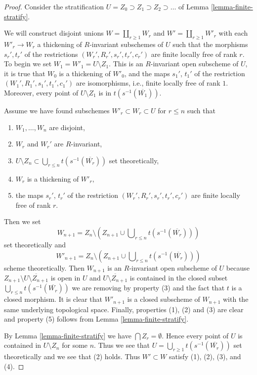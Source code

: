 \documentclass[10pt,a4paper]{amsart}
\theoremstyle{plain}
\theoremstyle{definition}
\theoremstyle{remark}
\numberwithin{equation}{subsection}
\begin{document}
\begin{proof}
Consider the stratification $U = Z_0 \supset Z_1 \supset Z_2 \supset \ldots$
of Lemma \ref{lemma-finite-stratify}.

\medskip\noindent
We will construct disjoint unions $W = \coprod_{r \geq 1} W_r$ and
$W' = \coprod_{r \geq 1} W'_r$ with each $W'_r \to W_r$ a thickening
of $R$-invariant subschemes of $U$ such that the morphisms
$s_r', t_r'$ of the restrictions $(W_r', R_r', s_r', t_r', c_r')$
are finite locally free of rank $r$. To begin we set
$W_1 = W'_1 = U \setminus Z_1$. This is an $R$-invariant open
subscheme of $U$, it is true that $W_0$ is a thickening of $W'_0$,
and the maps $s_1'$, $t_1'$ of the
restriction $(W_1', R_1', s_1', t_1', c_1')$ are isomorphisms, i.e.,
finite locally free of rank $1$.
Moreover, every point of $U \setminus Z_1$ is in $t(s^{-1}(\overline{W_1}))$.

\medskip\noindent
Assume we have found subschemes $W'_r \subset W_r \subset U$ for $r \leq n$
such that
\begin{enumerate}
\item $W_1, \ldots, W_n$ are disjoint,
\item $W_r$ and $W_r'$ are $R$-invariant,
\item $U \setminus Z_n \subset \bigcup_{r \leq n} t(s^{-1}(\overline{W_r}))$
set theoretically,
\item $W_r$ is a thickening of $W'_r$,
\item the maps $s_r'$, $t_r'$ of the restriction
$(W_r', R_r', s_r', t_r', c_r')$ are finite locally free of rank $r$.
\end{enumerate}
Then we set
$$
W_{n + 1} = Z_n \setminus
\left(
Z_{n + 1} \cup \bigcup\nolimits_{r \leq n} t(s^{-1}(\overline{W_r}))
\right)
$$
set theoretically and
$$
W'_{n + 1} = Z_n \setminus
\left(
Z_{n + 1} \cup \bigcup\nolimits_{r \leq n} t(s^{-1}(\overline{W_r}))
\right)
$$
scheme theoretically. Then $W_{n + 1}$ is an $R$-invariant open subscheme
of $U$ because $Z_{n + 1} \setminus \overline{U \setminus Z_{n + 1}}$
is open in $U$ and $\overline{U \setminus Z_{n + 1}}$ is contained
in the closed subset $\bigcup\nolimits_{r \leq n} t(s^{-1}(\overline{W_r}))$
we are removing by property (3) and the fact that $t$ is a closed morphism.
It is clear that $W'_{n + 1}$ is a closed subscheme
of $W_{n + 1}$ with the same underlying topological space.
Finally, properties (1), (2) and (3) are clear and property (5) follows from
Lemma \ref{lemma-finite-stratify}.

\medskip\noindent
By Lemma \ref{lemma-finite-stratify} we have $\bigcap Z_r = \emptyset$.
Hence every point of $U$ is contained in $U \setminus Z_n$
for some $n$. Thus we see that
$U = \bigcup_{r \geq 1} t(s^{-1}(\overline{W_r}))$
set theoretically and we see that (2) holds.
Thus $W' \subset W$ satisfy (1), (2), (3), and (4).
\end{proof}
\end{document}
